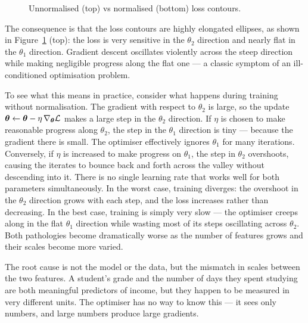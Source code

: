 \begin{figure}
\centering
\vspace{-1em}
\resizebox{0.26\textwidth}{!}{}
\resizebox{0.26\textwidth}{!}{}
\caption{Unnormalised (top) vs normalised (bottom) loss contours.}
\label{fig:normalisation}
\end{figure}

The consequence is that the loss contours are highly elongated ellipses, as shown in Figure~\ref{fig:normalisation} (top): the loss is very sensitive in the $\theta_2$ direction and nearly flat in the $\theta_1$ direction. Gradient descent oscillates violently across the steep direction while making negligible progress along the flat one — a classic symptom of an ill-conditioned optimisation problem.

To see what this means in practice, consider what happens during training without normalisation. The gradient with respect to $\theta_2$ is large, so the update $\boldsymbol{\theta} \leftarrow \boldsymbol{\theta} - \eta\,\nabla_{\boldsymbol{\theta}}\mathcal{L}$ makes a large step in the $\theta_2$ direction. If $\eta$ is chosen to make reasonable progress along $\theta_2$, the step in the $\theta_1$ direction is tiny — because the gradient there is small. The optimiser effectively ignores $\theta_1$ for many iterations. Conversely, if $\eta$ is increased to make progress on $\theta_1$, the step in $\theta_2$ overshoots, causing the iterates to bounce back and forth across the valley without descending into it. There is no single learning rate that works well for both parameters simultaneously. In the worst case, training diverges: the overshoot in the $\theta_2$ direction grows with each step, and the loss increases rather than decreasing. In the best case, training is simply very slow — the optimiser creeps along in the flat $\theta_1$ direction while wasting most of its steps oscillating across $\theta_2$. Both pathologies become dramatically worse as the number of features grows and their scales become more varied.

The root cause is not the model or the data, but the mismatch in scales between the two features. A student's grade and the number of days they spent studying are both meaningful predictors of income, but they happen to be measured in very different units. The optimiser has no way to know this — it sees only numbers, and large numbers produce large gradients.

